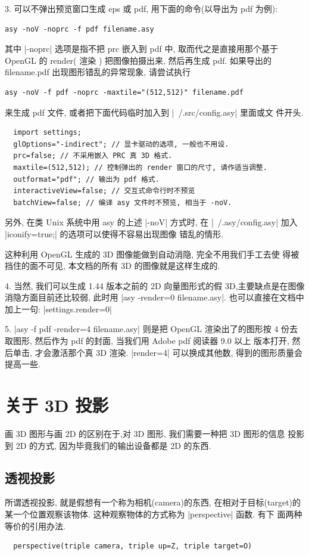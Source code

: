 \documentclass[nofonts,CJKnormalspaces]{ctexbook}
\begin{document}
3.  可以不弹出预览窗口生成 eps 或 pdf, 用下面的命令(以导出为 pdf 为例):
\begin{verbatim}
asy -noV -noprc -f pdf filename.asy
\end{verbatim}

其中 |-noprc| 选项是指不把 prc 嵌入到 pdf 中, 取而代之是直接用那个基于
OpenGL 的 render( 渲染 ) 把图像拍摄出来, 然后再生成 pdf. 如果导出的
filename.pdf 出现图形错乱的异常现象, 请尝试执行
\begin{verbatim}
asy -noV -f pdf -noprc -maxtile="(512,512)" filename.pdf
\end{verbatim}
来生成 pdf 文件, 或者把下面代码临时加入到 |~/.src/config.asy| 里面或文
件开头.
\begin{lstlisting}
  import settings;
  glOptions="-indirect"; // 显卡驱动的选项, 一般也不用设.
  prc=false; // 不采用嵌入 PRC 真 3D 格式.
  maxtile=(512,512); // 控制弹出的 render 窗口的尺寸, 请作适当调整.
  outformat="pdf"; // 输出为 pdf 格式.
  interactiveView=false; // 交互式命令行时不预览
  batchView=false; // 编译 asy 文件时不预览, 相当于 -noV.
\end{lstlisting}

另外, 在类 Unix 系统中用 asy 的上述 |-noV| 方式时, 在
|~/.asy/config.asy| 加入 |iconify=true;| 的选项可以使得不容易出现图像
错乱的情形.


这种利用 OpenGL 生成的 3D 图像能做到自动消隐, 完全不用我们手工去使
得被挡住的面不可见, 本文档的所有 3D 的图像就是这样生成的.


4. 当然, 我们可以生成 1.44 版本之前的 2D 向量图形式的假 3D,主要缺点是在图像消隐方面目前还比较弱, 此时用
|asy -render=0 filename.asy|.
也可以直接在文档中加上一句: |settings.render=0|

5. |asy -f pdf -render=4 filename.asy| 则是把 OpenGL 渲染出了的图形按
4 份去取图形, 然后作为 pdf 的封面, 当我们用 Adobe pdf 阅读器 9.0 以上
版本打开, 然后单击, 才会激活那个真 3D 渲染. |render=4| 可以换成其他数,
得到的图形质量会提高一些.

\section{关于 3D 投影}
画 3D 图形与画 2D 的区别在于,对 3D 图形, 我们需要一种把 3D 图形的信息
投影到 2D 的方式, 因为毕竟我们的输出设备都是 2D 的东西.

\subsection{透视投影}
所谓透视投影, 就是假想有一个称为相机(camera)的东西, 在相对于目标(target)的
某一个位置观察该物体. 这种观察物体的方式称为 |perspective| 函数. 有下
面两种等价的引用办法.
\begin{lstlisting}
  perspective(triple camera, triple up=Z, triple target=O)
\end{lstlisting}
\end{document}

